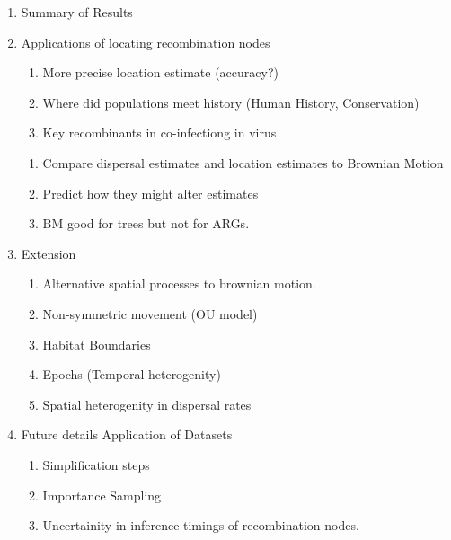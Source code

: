 \begin{enumerate}
    \item Summary of Results 

    \item Applications of locating recombination nodes 
    \begin{enumerate}
        \item More precise location estimate (accuracy?)
        \item Where did populations meet history (Human History, Conservation)
        \item Key recombinants in co-infectiong in virus 
    \end{enumerate}
    
    \begin{enumerate}
        \item Compare dispersal estimates and location estimates to Brownian Motion
        \item Predict how they might alter estimates
        \item BM good for trees but not for ARGs. 
    \end{enumerate}
        
    \item Extension
    \begin{enumerate}
        \item Alternative spatial processes to brownian motion. 
        \item Non-symmetric movement (OU model)
        \item Habitat Boundaries 
        \item Epochs (Temporal heterogenity) 
        \item Spatial heterogenity in dispersal rates
    \end{enumerate}
    \item Future details Application of Datasets 
    \begin{enumerate}
        \item Simplification steps 
        \item Importance Sampling 
        \item Uncertainity in inference timings of recombination nodes. 
    \end{enumerate}
\end{enumerate}





